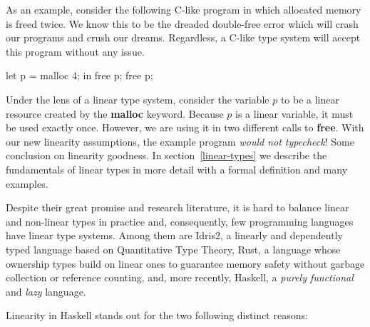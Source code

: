 \documentclass[]{lwnovathesis}
\begin{document}
As an example, consider the following C-like program in which allocated memory
is freed twice. We know this to be the dreaded double-free error which will
crash our programs and crush our dreams. Regardless, a C-like type system will
accept this program without any issue.
\begin{code}
let p = malloc 4;
 in free p;
    free p;
\end{code}

Under the lens of a linear type system, consider the variable $p$ to be a linear
resource created by the \textbf{malloc} keyword. Because $p$ is a linear
variable, it must be used exactly once. However, we are using it in two
different calls to \textbf{free}. With our new linearity assumptions, the
example program \emph{would not typecheck}! Some conclusion on linearity
goodness. In section~\ref{linear-types} we describe the fundamentals of linear
types in more detail with a formal definition and many examples.

Despite their great promise and research literature, it is hard to balance
linear and non-linear types in practice and, consequently, few programming
languages have linear type systems. Among them are Idris2\cite{}, a linearly and
dependently typed language based on Quantitative Type Theory, Rust\cite{}, a
language whose ownership types build on linear ones to guarantee memory safety
without garbage collection or reference counting, and, more recently,
Haskell\cite{}, a \emph{purely functional} and \emph{lazy} language.

Linearity in Haskell stands out %
for the two following distinct reasons:
\end{document}
